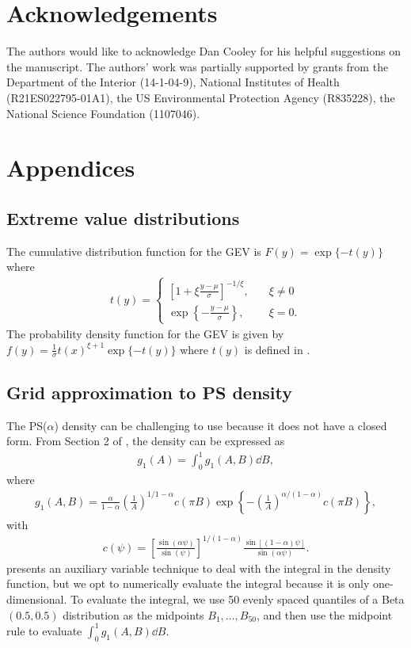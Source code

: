 \documentclass[11pt]{article}
\begin{document}
\section*{Acknowledgements}
The authors would like to acknowledge Dan Cooley for his helpful suggestions on the manuscript.
The authors' work was partially supported by grants from the Department of the Interior (14-1-04-9), National Institutes of Health (R21ES022795-01A1), the US Environmental Protection Agency (R835228), the National Science Foundation (1107046).

\appendix
\section{Appendices}
\subsection{Extreme value distributions} \label{eba:GEV}
The cumulative distribution function for the GEV is $F(y) = \exp\{-t(y)\}$ where
\begin{align} \label{ebeq:gevt}
  t(y) = \left\{ \begin{array}{ll}
      \left[1 + \xi \displaystyle \frac{y - \mu}{\sigma}\right]^{-1 / \xi}, \quad &\xi \neq 0 \\ [0.5em]
      \exp\left\{- \displaystyle \frac{y - \mu}{\sigma}\right\}, &\xi = 0.
  \end{array}\right.
\end{align}
The probability density function for the GEV is given by $f(y) = \frac{1}{\sigma} t(x)^{\xi + 1} \exp\{-t(y)\}$ where $t(y)$ is defined in .

\subsection{Grid approximation to PS density} \label{eba:gridapprox}
The PS($\alpha$) density can be challenging to use because it does not have a closed form.
From Section 2 of \citep{Stephenson2009}, the density can be expressed as
\begin{align}
  g_1(A) = \int_0^1 g_1(A, B) \dd B,
\end{align}
where
\begin{align}
  g_1(A, B) = \frac{\alpha}{1 - \alpha} \left( \frac{1}{A} \right)^{1 / 1 - \alpha} c(\pi B) \exp \left\{ -\left(\frac{1}{A}\right)^{\alpha / (1 - \alpha)} c(\pi B) \right\},
\end{align}
with
\begin{align}
  c(\psi) = \left[\frac{\sin(\alpha \psi)}{\sin(\psi)}\right]^{1 / (1 - \alpha)} \frac{\sin[(1 - \alpha) \psi]}{\sin(\alpha \psi)}.
\end{align}
 presents an auxiliary variable technique to deal with the integral in the density function, but we opt to numerically evaluate the integral because it is only one-dimensional.
To evaluate the integral, we use 50 evenly spaced quantiles of a Beta$(0.5, 0.5)$ distribution as the midpoints $B_1, \ldots, B_{50}$, and then use the midpoint rule to evaluate $\displaystyle \int_0^1 g_1(A, B) \dd B$.
\end{document}
